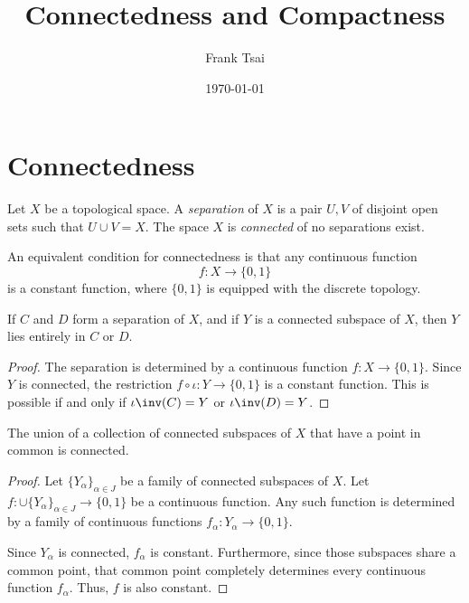 \documentclass{amsart}
\title{Connectedness and Compactness}
\author{Frank Tsai}
\date{\today}
\begin{document}
\maketitle
\tableofcontents

\section{Connectedness}
\label{sec:connectedness}

\begin{defn}
  Let $X$ be a topological space.
  A \emph{separation} of $X$ is a pair $U, V$ of disjoint open sets such that $U \cup V = X$.
  The space $X$ is \emph{connected} of no separations exist.

  An equivalent condition for connectedness is that any continuous function
  \[
    f : X \to \{0,1\}
  \]
  is a constant function, where $\{0,1\}$ is equipped with the discrete topology.
\end{defn}

\begin{lem}\label{lem:connected-fiber}
  If $C$ and $D$ form a separation of $X$, and if $Y$ is a connected subspace of $X$, then $Y$ lies entirely in $C$ or $D$.
\end{lem}
\begin{proof}
  The separation is determined by a continuous function $f : X \to \{0,1\}$.
  Since $Y$ is connected, the restriction $f \circ \iota : Y \to \{0,1\}$ is a constant function.
  This is possible if and only if $\iota\inv(C) = Y$ or $\iota\inv(D) = Y$.
\end{proof}

\begin{lem}\label{lem:connected-union-connected}
  The union of a collection of connected subspaces of $X$ that have a point in common is connected.
\end{lem}
\begin{proof}
  Let $\{Y_{\alpha}\}_{\alpha \in J}$ be a family of connected subspaces of $X$.
  Let $f : \cup\{Y_{\alpha}\}_{\alpha \in J} \to \{0,1\}$ be a continuous function.
  Any such function is determined by a family of continuous functions $f_{\alpha} : Y_{\alpha} \to \{0,1\}$.

  Since $Y_{\alpha}$ is connected, $f_{\alpha}$ is constant.
  Furthermore, since those subspaces share a common point, that common point completely determines every continuous function $f_{\alpha}$.
  Thus, $f$ is also constant.
\end{proof}
\end{document}
